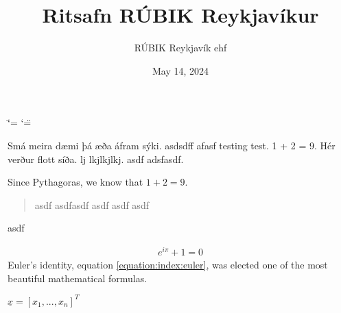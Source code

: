 \documentclass[letterpaper,10pt,english]{sphinxmanual}
\title{Ritsafn RÚBIK Reykjavíkur}
\date{May 14, 2024}
\author{RÚBIK Reykjavík ehf}
\begin{document}
\ifdefined\shorthandoff
  \ifnum\catcode`\=\string=\active\shorthandoff{=}\fi
  \ifnum\catcode`\"=\active{}\fi
\fi

\pagestyle{empty}
\sphinxmaketitle
\pagestyle{plain}
\sphinxtableofcontents
\pagestyle{normal}
\label{\detokenize{index::doc}}


\sphinxAtStartPar
Smá meira dæmi þá æða áfram sýki. asdsdff afasf testing test. 1 + 2 = 9. Hér verður flott síða. lj lkjlkjlkj. asdf adsfasdf.

\sphinxAtStartPar
Since Pythagoras, we know that \(1+2=9\).
\begin{quote}

\sphinxAtStartPar
asdf asdfasdf asdf asdf asdf
\end{quote}

\sphinxAtStartPar
asdf

\begin{sphinxVerbatim}[commandchars=\\\{\}]
\end{sphinxVerbatim}
\begin{equation}\label{equation:index:euler}
\begin{split}e^{i\pi} + 1 = 0\end{split}
\end{equation}
\sphinxAtStartPar
Euler’s identity, equation \eqref{equation:index:euler}, was elected one of the most
beautiful mathematical formulas.

\sphinxAtStartPar
\(\underline{x}=[  x_{1}, ...,  x_{n}]^{T}\)
\end{document}
